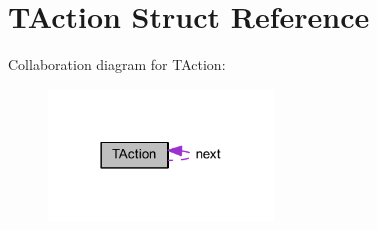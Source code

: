 \hypertarget{struct_t_action}{}\section{T\+Action Struct Reference}
\label{struct_t_action}


Collaboration diagram for T\+Action\+:
\nopagebreak
\begin{figure}[H]
\begin{center}
\leavevmode
\includegraphics[width=170pt]{d8/d42/struct_t_action__coll__graph}
\end{center}
\end{figure}
